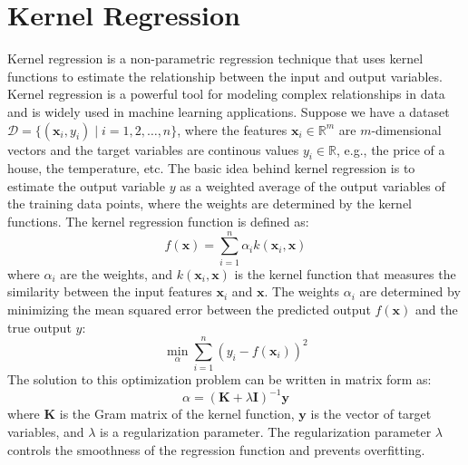 \documentclass{article}[11pt]
\def\D{\mathcal{D}}
\begin{document}
\section{Kernel Regression}
Kernel regression is a non-parametric regression technique that uses kernel functions to estimate the relationship between the input and output variables.
Kernel regression is a powerful tool for modeling complex relationships in data and is widely used in machine learning applications.
Suppose we have a dataset $\D = \{(\mathbf{x}_{i},y_{i}) \mid i = 1,2,\dots,n\}$, where the features $\mathbf{x}_i \in \mathbb{R}^{m}$ 
are $m$-dimensional vectors and the target variables are continous values $y_i \in \mathbb{R}$, e.g., the price of a house, the temperature, etc.
The basic idea behind kernel regression is to estimate the output variable $y$ as a weighted average of the output variables of the training data points, 
where the weights are determined by the kernel functions. The kernel regression function is defined as:
\begin{equation}
f(\mathbf{x}) = \sum_{i=1}^{n} \alpha_i k(\mathbf{x}_i, \mathbf{x})
\end{equation}
where $\alpha_i$ are the weights, and $k(\mathbf{x}_i, \mathbf{x})$ is the kernel function that measures the similarity between the input features $\mathbf{x}_i$ and $\mathbf{x}$.
The weights $\alpha_i$ are determined by minimizing the mean squared error between the predicted output $f(\mathbf{x})$ and the true output $y$:
\begin{equation}
\min_{\alpha} \sum_{i=1}^{n} (y_i - f(\mathbf{x}_i))^2
\end{equation}
The solution to this optimization problem can be written in matrix form as:
\begin{equation}
\alpha = (\mathbf{K} + \lambda \mathbf{I})^{-1}\mathbf{y}
\end{equation}
where $\mathbf{K}$ is the Gram matrix of the kernel function, $\mathbf{y}$ is the vector of target variables, and $\lambda$ is a regularization parameter.
The regularization parameter $\lambda$ controls the smoothness of the regression function and prevents overfitting.
\end{document}
